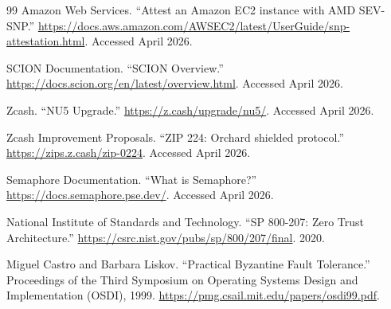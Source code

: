 \documentclass[11pt,letterpaper]{article}
\begin{document}
\begin{thebibliography}{99}
Amazon Web Services. ``Attest an Amazon EC2 instance with AMD SEV-SNP.'' \url{https://docs.aws.amazon.com/AWSEC2/latest/UserGuide/snp-attestation.html}. Accessed April 2026.

SCION Documentation. ``SCION Overview.'' \url{https://docs.scion.org/en/latest/overview.html}. Accessed April 2026.

Zcash. ``NU5 Upgrade.'' \url{https://z.cash/upgrade/nu5/}. Accessed April 2026.

Zcash Improvement Proposals. ``ZIP 224: Orchard shielded protocol.'' \url{https://zips.z.cash/zip-0224}. Accessed April 2026.

Semaphore Documentation. ``What is Semaphore?'' \url{https://docs.semaphore.pse.dev/}. Accessed April 2026.

National Institute of Standards and Technology. ``SP 800-207: Zero Trust Architecture.'' \url{https://csrc.nist.gov/pubs/sp/800/207/final}. 2020.

Miguel Castro and Barbara Liskov. ``Practical Byzantine Fault Tolerance.'' Proceedings of the Third Symposium on Operating Systems Design and Implementation (OSDI), 1999. \url{https://pmg.csail.mit.edu/papers/osdi99.pdf}.

\end{thebibliography}
\end{document}
